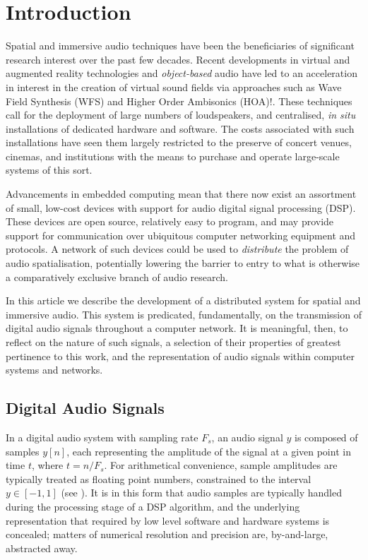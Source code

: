 \section{Introduction}\label{sec:introduction}

Spatial and immersive audio techniques have been the beneficiaries of
significant research interest over the past few decades.
Recent developments in virtual and augmented reality technologies and
\textit{object-based} audio have led to an acceleration in interest in the
creation of virtual sound fields via approaches such as Wave Field Synthesis
(WFS) and Higher Order Ambisonics (HOA)!\citep{berkhout_acoustic_1993,
    ahrens_theory_2008,daniel_further_2003,frank_producing_2015}.
These techniques call for the deployment of large numbers of loudspeakers, and
centralised, \textit{in situ} installations of dedicated hardware and software.
The costs associated with such installations have seen them largely restricted
to the preserve of concert venues, cinemas, and institutions with the means to
purchase and operate large-scale systems of this sort.

Advancements in embedded computing mean that there now exist an assortment of
small, low-cost devices with support for audio digital signal processing (DSP).
These devices are open source, relatively easy to program, and may provide
support for communication over ubiquitous computer networking equipment and
protocols.
A network of such devices could be used to \textit{distribute} the problem of
audio spatialisation, potentially lowering the barrier to entry to what is
otherwise a comparatively exclusive branch of audio research.

In this article we describe the development of a distributed system for spatial
and immersive audio.
This system is predicated, fundamentally, on the transmission of digital audio
signals throughout a computer network.
It is meaningful, then, to reflect on the nature of such signals, a selection
of their properties of greatest pertinence to this work, and the representation
of audio signals within computer systems and networks.

\subsection{Digital Audio Signals}\label{subsec:digital-audio-signals}

In a digital audio system with sampling rate $F_s$, an audio signal $y$ is
composed of samples $y[n]$, each representing the amplitude of the signal at a
given point in time $t$, where $t = n/F_s$.
For arithmetical convenience, sample amplitudes are typically treated as
floating point numbers, constrained to the interval $y \in [-1, 1]$ (see
).
It is in this form that audio samples are typically handled during the
processing stage of a DSP algorithm, and the underlying representation
\textemdash{} that required by low level software and hardware systems
\textemdash{} is concealed; matters of numerical resolution and precision are,
by-and-large, abstracted away.

